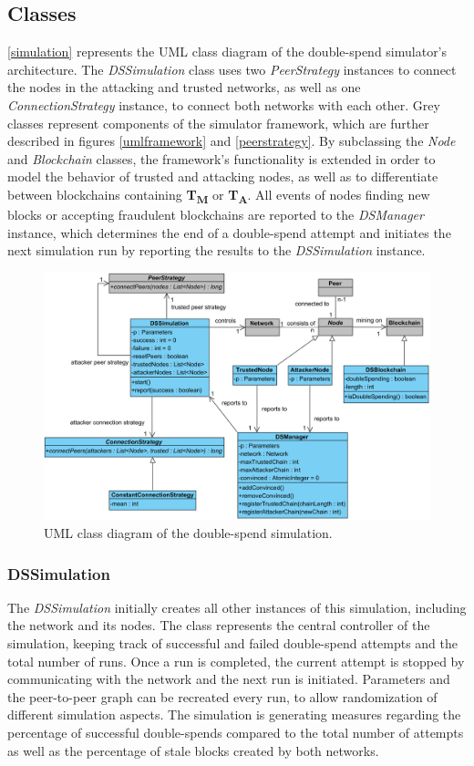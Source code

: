 \documentclass[a4paper,12pt,twoside]{report}
\begin{document}
\subsection{Classes}
\autoref{simulation} represents the UML class diagram of the double-spend simulator's architecture. The \textit{DSSimulation} class uses two \textit{PeerStrategy} instances to connect the nodes in the attacking and trusted networks, as well as one \textit{ConnectionStrategy} instance, to connect both networks with each other. Grey classes represent components of the simulator framework, which are further described in figures \ref{umlframework} and \ref{peerstrategy}. By subclassing the \textit{Node} and \textit{Blockchain} classes, the framework's functionality is extended in order to model the behavior of trusted and attacking nodes, as well as to differentiate between blockchains containing \textbf{T\textsubscript{M}} or \textbf{T\textsubscript{A}}. All events of nodes finding new blocks or accepting fraudulent blockchains are reported to the \textit{DSManager} instance, which determines the end of a double-spend attempt and initiates the next simulation run by reporting the results to the \textit{DSSimulation} instance.
\begin{figure}
	\centering
  \includegraphics[width=\textwidth]{Simulation.png}
	\caption{UML class diagram of the double-spend simulation.}
	\label{simulation}
\end{figure}
\subsubsection{DSSimulation}
The \textit{DSSimulation} initially creates all other instances of this simulation, including the network and its nodes. The class represents the central controller of the simulation, keeping track of successful and failed double-spend attempts and the total number of runs. Once a run is completed, the current attempt is stopped by communicating with the network and the next run is initiated. Parameters and the peer-to-peer graph can be recreated every run, to allow randomization of different simulation aspects. The simulation is generating measures regarding the percentage of successful double-spends compared to the total number of attempts as well as the percentage of stale blocks created by both networks.
\end{document}
